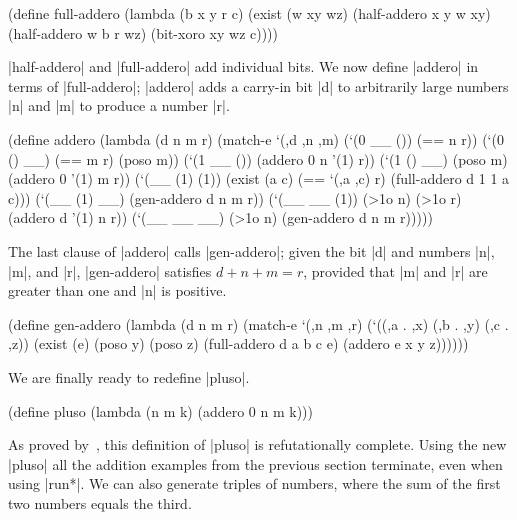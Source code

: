 \schemedisplayspace
\begin{schemedisplay}
(define full-addero
  (lambda (b x y r c)
    (exist (w xy wz)
      (half-addero x y w xy)
      (half-addero w b r wz)
      (bit-xoro xy wz c))))
\end{schemedisplay}

\scheme|half-addero| and \scheme|full-addero| add individual bits.  We
now define \scheme|addero| in terms of \scheme|full-addero|;
\scheme|addero| adds a carry-in bit \scheme|d| to arbitrarily large
numbers \scheme|n| and \scheme|m| to produce a number \scheme|r|.

\newpage

\begin{schemedisplay}
(define addero
  (lambda (d n m r)
    (match-e `(,d ,n ,m)
      (`(0 __ ()) (== n r))
      (`(0 () __) (== m r) (poso m))
      (`(1 __ ())
       (addero 0 n '(1) r))
      (`(1 () __)
       (poso m)
       (addero 0 '(1) m r))
      (`(__ (1) (1))
       (exist (a c)
         (== `(,a ,c) r)
         (full-addero d 1 1 a c)))
      (`(__ (1) __)
       (gen-addero d n m r))
      (`(__ __ (1))
       (>1o n) (>1o r)
       (addero d '(1) n r))
      (`(__ __ __) 
       (>1o n) 
       (gen-addero d n m r)))))
\end{schemedisplay}

The last clause of \scheme|addero| calls \scheme|gen-addero|; given
the bit \scheme|d| and numbers \scheme|n|, \scheme|m|, and \scheme|r|,
\scheme|gen-addero| satisfies $d + n + m = r$, provided that
\scheme|m| and \scheme|r| are greater than one and \scheme|n| is
positive.

\schemedisplayspace
\begin{schemedisplay}
(define gen-addero
  (lambda (d n m r)
    (match-e `(,n ,m ,r)
      (`((,a . ,x) (,b . ,y) (,c . ,z))
       (exist (e)
         (poso y) (poso z)
         (full-addero d a b c e)
         (addero e x y z))))))
\end{schemedisplay}

We are finally ready to redefine \scheme|pluso|.

\schemedisplayspace
\begin{schemedisplay}
(define pluso (lambda (n m k) (addero 0 n m k)))
\end{schemedisplay}

\noindent As proved by~\citet{conf/flops/KiselyovBFS08}, this
definition of \scheme|pluso| is refutationally complete.  Using the
new \scheme|pluso| all the addition examples from the previous section
terminate, even when using \scheme|run*|.  We can also generate
triples of numbers, where the sum of the first two numbers equals the
third.

